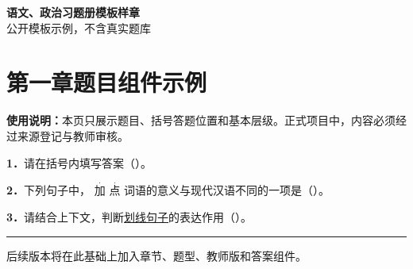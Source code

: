 \documentclass[UTF8,zihao=-4]{ctexart}
\newcommand{\question}[2]{%
  \par\noindent\textbf{#1}\quad #2\par
}
\newcommand{\marked}[1]{%
  \ensuremath{\overset{\scriptstyle\cdot}{\text{#1}}}%
}
\begin{document}
\begin{center}
  {\bfseries 语文、政治习题册模板样章}
  \\
  {\small\color{workbookgray}公开模板示例，不含真实题库}
\end{center}

\section*{第一章\hspace{1em}题目组件示例}

\noindent\textbf{使用说明：}本页只展示题目、括号答题位置和基本层级。正式项目中，内容必须经过来源登记与教师审核。

\question{1．}{请在括号内填写答案（\hspace{3em}）。}

\question{2．}{下列句子中，\marked{加}\marked{点}词语的意义与现代汉语不同的一项是（\hspace{3em}）。}

\question{3．}{请结合上下文，判断\uline{划线句子}的表达作用（\hspace{7em}）。}

\vspace{1em}
\noindent\rule{\linewidth}{0.4pt}

\begin{center}
  {\small\color{workbookgray}后续版本将在此基础上加入章节、题型、教师版和答案组件。}
\end{center}
\end{document}
